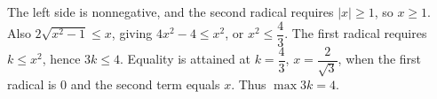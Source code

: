 The left side is nonnegative, and the second radical requires $|x|\ge1$, so $x\ge1$. Also $2\sqrt{x^2-1}\le x$, giving $4x^2-4\le x^2$, or $x^2\le\dfrac{4}{3}$. The first radical requires $k\le x^2$, hence $3k\le4$. Equality is attained at $k=\dfrac{4}{3}$, $x=\dfrac{2}{\sqrt3}$, when the first radical is 0 and the second term equals $x$. Thus $\boxed{\max3k=4}$.
